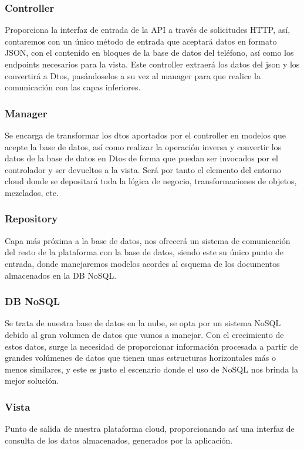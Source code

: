 \documentclass[12pt,a4paper,oneside]{book} %
\begin{document}
\subsubsection{Controller}
Proporciona la interfaz de entrada de la API a través de solicitudes HTTP, así, contaremos con un único método de entrada que aceptará datos en formato JSON, con el contenido en bloques de la base de datos del teléfono, así como los endpoints necesarios para la vista. 
\newline
\newline
Este controller extraerá los datos del json y los convertirá a Dtos, pasándoselos a su vez al manager para que realice la comunicación con las capas inferiores. 
\subsubsection{Manager}
Se encarga de transformar los dtos aportados por el controller en modelos que acepte la base de datos, así como realizar la operación inversa y convertir los datos de la base de datos en Dtos de forma que puedan ser invocados por el controlador y ser devueltos a la vista. 
\newline
\newline
Será por tanto el elemento del entorno cloud donde se depositará toda la lógica de negocio, transformaciones de objetos, mezclados, etc. 
\subsubsection{Repository}
Capa más próxima a la base de datos, nos ofrecerá un sistema de comunicación del resto de la plataforma con la base de datos, siendo este su único punto de entrada, donde manejaremos modelos acordes al esquema de los documentos almacenados en la DB NoSQL. 
\subsubsection{DB NoSQL}
Se trata de nuestra base de datos en la nube, se opta por un sistema NoSQL debido al gran volumen de datos que vamos a manejar. Con el crecimiento de estos datos, surge la necesidad de proporcionar información procesada a partir de grandes volúmenes de datos que tienen unas estructuras horizontales más o menos similares, y este es justo el escenario donde el uso de NoSQL nos brinda la mejor solución. 
\subsubsection{Vista}
Punto de salida de nuestra plataforma cloud, proporcionando así una interfaz de consulta de los datos almacenados, generados por la aplicación. \\
\end{document}
